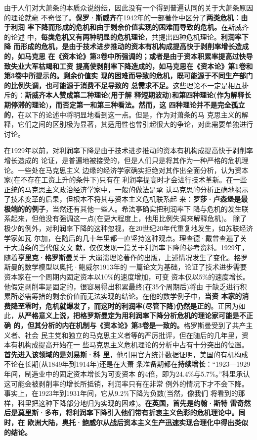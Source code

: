 由于人们对大萧条的本质众说纷纭，因此没有一个得到普遍认同的关于大萧条原因的理论就毫
不奇怪了。\textbf{保罗·斯威齐}在1942年的一部著作中区分了\textbf{两类危机：由于利润
率下降而形成的危机和由于剩余价值实现的困难而导致的危机。}在斯威齐的论述
中，\textbf{每类危机又有两种明显的危机理论}，共提出四种危机理论。\textbf{利润率下降
而形成的危机，是由于技术进步推动的资本有机构成提高快于剥削率增长造成的，如马克思
在《资本论》第3卷中所强调的；或者是由于资本积累率提高过快导致失业大军枯竭和工资
提高使剥削率下降造成的，如马克思在《资本论》第1卷和第3卷中所提示的。剩余价值实
现的困难而导致的危机，既可能源于不同生产部门的比例失调，也可能源于消费不足导致的
总需求不足。}这些理论不一定是相互排斥的：\textbf{斯威齐本人赞成第二种理论(用于解
释短期波动)和第四种理论(作为解释长期停滞的理论)，而否定第一和第三种看法。然而，这
四种理论并不是完全孤立的}，在以下的论述中将明显地看到这一点。但是，作为对萧条的马
克思主义的解释，它们之间的区别极为显著，其适用性也曾引起很大的争论，对此需要单独进行
讨论。

在1929年以前，对利润率下降是由于技术进步推动的资本有机构成提高快于剥削率增长造成的
论证，是普遍地被接受的，但是人们只是将其作为一种严格的危机理论。一些处在马克思主义
边缘的经济学家确实拒绝对其作出全面分析，认为资本家(在不存在工资上升的条件下)只有在
利润率提高时才会进行技术革新。在一些正统的马克思主义政治经济学家中，一般的做法是承
认马克思的分析正确地揭示了技术变革的后果，但根本不将其与资本主义危机联系起
来：\textbf{罗莎·卢森堡是最极端的的例子}，当然还有其他一些人。希法亭确实把利润率下
降与危机的发生联系起来，但他没有强调这一点(在更大程度上，他用比例失调来解释危机)。
除了极少的例外，对利润率下降的这种忽视，在20世纪20年代重复地发生，如苏联经济学家如瓦
尔加，在随后的几十年里都一直坚持这种观点。理查德·戴曾查遍了关于大萧条的当代俄文文
献，仅仅发现一篇关于利润率下降的参考资料。1929年，随着\textbf{亨里克·格罗斯曼}关于
大崩溃理论著作的出版，上述情况发生了变化。格罗斯曼的数学模型以奥托·鲍威尔1913年的
一篇论文为基础，论证了技术进步需要资本家在一个周期内固定资本以10\%的速度增加，可变
资本仅以5\%的速度增长。他假定剥削率是固定的，很容易得出积累最终(在35个周期后)将由
于缺乏进行积累所必需筹措的剩余价值而无法实现的结论。在他的数学例子中，\textbf{当资
本家的消费降至零时，危机就爆发了，而这时的利润率(尽管下降)仍然是正的}。正因为如
此，\textbf{从严格意义上说，把格罗斯曼定为用利润率下降分析危机的理论家可能是不正确
的，但其分析的内在机制与《资本论》第3卷是一致的。}格罗斯曼受到了共产主义者、社会
民主党和独立的马克思主义者等的严厉批评，但在随后的几年里，资本有机构成提高开始在一
些马克思主义危机理论的分析中占有十分突出的位置。\textbf{首先进入该领域的是刘易斯·科
里}，他引用官方统计数据证明，美国的有机构成不论在长期(从1849年到1914年)还是在大萧
条准备期都在\textbf{持续增长}：“1923—1929年间，制造业中的固定资本增长为可变资本
的4倍，即为24.4\%与5.7\%。”科里承认这可能会被剥削率的增长所抵销，利润率只有在非常
例外的情况下才不会下降。事实上，在1923年到1931年间，它从9.2\%下降为负数(当然，像我们
将看到的那样，科里把这种下降部分地归为实现的困难)。\textbf{在英国，首先是约翰·斯特
雷奇然后是莫里斯·多布，将利润率下降引入他们带有折衷主义色彩的危机理论中。同时，在
欧洲大陆，奥托·鲍威尔从战后资本主义生产迅速实现合理化中得出类似的结论。}

